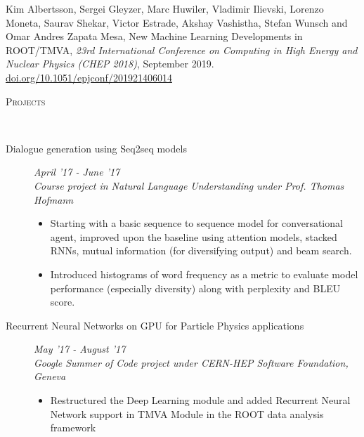 \documentclass[9pt]{article}
\newenvironment{changemargin}[2]{%
  \begin{list}{}{%
      \setlength{\topsep}{0pt}%
    \setlength{\leftmargin}{#1}%
    \setlength{\rightmargin}{#2}%
    \setlength{\listparindent}{\parindent}%
  \setlength{\itemindent}{\parindent}%
    \setlength{\parsep}{\parskip}%
    }%
  \item[]}{\end{list}
    }
\newcommand{\lineover}{
  \begin{changemargin}{-0.05in}{-0.10in}
    \vspace*{-9pt}
    \hrulefill \\
    \vspace*{-2pt}
  \end{changemargin}
}
\newcommand{\header}[1]{
  \begin{changemargin}{-0.5in}{-0.5in}
    \scshape{#1}\\
        \lineover
  \end{changemargin}
}
\newenvironment{body} {
  \vspace*{-16pt}
        \begin{changemargin}{-0.6in}{-0.65in}
        }	
        {\end{changemargin}
}
\begin{document}
Kim Albertsson, Sergei Gleyzer, Marc Huwiler, Vladimir Ilievski, Lorenzo Moneta, Saurav Shekar, Victor Estrade, Akshay Vashistha, Stefan Wunsch and Omar Andres Zapata Mesa, New Machine Learning Developments in ROOT/TMVA, \textit{23rd International Conference on Computing in High Energy and Nuclear Physics (CHEP 2018)}, September 2019.
\href{https://doi.org/10.1051/epjconf/201921406014}{doi.org/10.1051/epjconf/201921406014}
\header{Projects}
\begin{body}
  \vspace{14pt}

  \begin{description}
    \item[\normalsize{Dialogue generation using Seq2seq models}] \hfill \textit{April '17 - June '17} \\
      \textit{Course project in Natural Language Understanding under Prof. Thomas Hofmann}
      \begin{itemize}
        \item Starting with a basic sequence to sequence model for conversational agent, improved upon the baseline using attention models, stacked RNNs, mutual information (for diversifying output) and beam search.
        \item Introduced histograms of word frequency as a metric to evaluate model performance (especially diversity) along with perplexity and BLEU score.
    \end{itemize}

    \item[\normalsize{Recurrent Neural Networks on GPU for Particle Physics applications}] \hfill \textit{May '17 - August '17} \\
      \textit{Google Summer of Code project under CERN-HEP Software Foundation, Geneva}
      \begin{itemize}
        \item Restructured the Deep Learning module and added Recurrent Neural Network
          support in TMVA Module in the ROOT data analysis framework
      \end{itemize}


\end{description}
\end{body}
\end{document}
